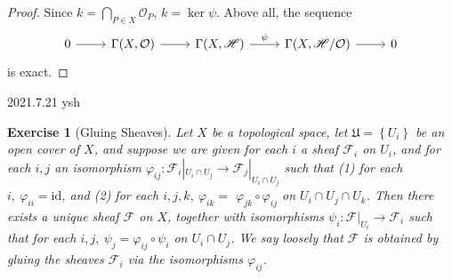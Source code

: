 \documentclass{amsart}
\newtheorem{exe}{Exercise}[subsection]
\theoremstyle{remark}\newtheorem{rmk}[theorem]{Remark}
\begin{document}
\begin{proof}
	Since $k=\bigcap_{P\in X}\mathcal{O}_P$, $k=\ker\psi$. Above all, the sequence
	\begin{equation*}
		\begin{tikzcd}
			0 \arrow[r] & {\Gamma(X,\mathcal{O})} \arrow[r] & {\Gamma(X,\mathscr{H})} \arrow[r, "\psi"] & {\Gamma(X,\mathscr{H}/\mathcal{O})} \arrow[r] & 0
		\end{tikzcd}
	\end{equation*}
	is exact.
\end{proof}

2021.7.21 ysh

\begin{exe}[Gluing Sheaves]
	\label{2.1.22}
	Let $X$ be a topological space, let $\mathfrak{U}=\left\{U_{i}\right\}$ be an open cover of $X$, and suppose we are given for each $i$ a sheaf $\mathscr{F}_{i}$ on $U_{i}$, and for each $i, j$ an isomorphism $\varphi_{i j}:\mathscr{F}_{i}|_{U_{i} \cap U_{j}} \rightarrow \mathscr{F}_{j}|_{U_{i} \cap U_{j}}$ such that
	(1) for each $i,\ \varphi_{i i}=\mathrm{id}$, and
	(2) for each $i, j, k,\ \varphi_{i k}=$ $\varphi_{j k} \circ \varphi_{i j}$ on $U_{i} \cap U_{j} \cap U_{k} $. Then there exists a unique sheaf $\mathscr{F}$ on $X$, together with isomorphisms $\psi_{i}:\mathscr{F}|_{U_{i}} \rightarrow \mathscr{F}_{i}$ such that for each $i, j,\ \psi_{j}=\varphi_{i j} \circ \psi_{i}$ on $U_{i} \cap U_{j}$. We say loosely that $\mathscr{F}$ is
	obtained by gluing the sheaves $\mathscr{F}_{i}$ via the isomorphisms $\varphi_{i j}$.
\end{exe}
\end{document}
